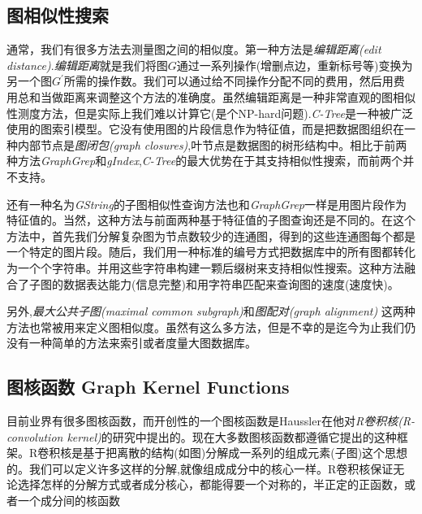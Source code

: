\documentclass{article}
\begin{document}
\subsection{图相似性搜索}
通常，我们有很多方法去测量图之间的相似度。第一种方法是\emph{编辑距离(edit distance)}.\emph{编辑距离}就是我们将图$G$通过一系列操作(增删点边，重新标号等)变换为另一个图$G^{'}$所需的操作数。我们可以通过给不同操作分配不同的费用，然后用费用总和当做距离来调整这个方法的准确度。虽然编辑距离是一种非常直观的图相似性测度方法，但是实际上我们难以计算它(是个NP-hard问题).\emph{C-Tree}\cite{C-Tree}是一种被广泛使用的图索引模型。它没有使用图的片段信息作为特征值，而是把数据图组织在一种内部节点是\emph{图闭包(graph closures)},叶节点是数据图的树形结构中。相比于前两种方法\emph{GraphGrep}和\emph{gIndex},\emph{C-Tree}的最大优势在于其支持相似性搜索，而前两个并不支持。

还有一种名为\emph{GString}的子图相似性查询方法也和\emph{GraphGrep}一样是用图片段作为特征值的。当然，这种方法与前面两种基于特征值的子图查询还是不同的。在这个方法中，首先我们分解复杂图为节点数较少的连通图，得到的这些连通图每个都是一个特定的图片段。随后，我们用一种标准的编号方式把数据库中的所有图都转化为一个个字符串。并用这些字符串构建一颗后缀树来支持相似性搜索。这种方法融合了子图的数据表达能力(信息完整)和用字符串匹配来查询图的速度(速度快)。

另外,\emph{最大公共子图(maximal common subgraph)}\cite{mcs}和\emph{图配对(graph alignment)}\cite{assignment,assigment08} 这两种方法也常被用来定义图相似度。虽然有这么多方法，但是不幸的是迄今为止我们仍没有一种简单的方法来索引或者度量大图数据库。

\subsection{图核函数 Graph Kernel Functions}
目前业界有很多图核函数，而开创性的一个图核函数是Haussler在他对\emph{R卷积核(R-convolution kernel)}的研究中提出的。现在大多数图核函数都遵循它提出的这种框架。R卷积核是基于把离散的结构(如图)分解成一系列的组成元素(子图)这个思想的。我们可以定义许多这样的分解,就像组成成分中的核心一样。R卷积核保证无论选择怎样的分解方式或者成分核心，都能得要一个对称的，半正定的正函数，或者一个成分间的核函数

\ifx\allfiles\undefined
%
%
\end{document}
